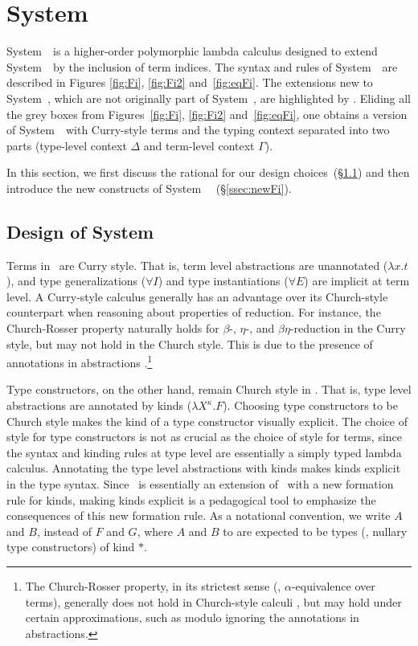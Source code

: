 \section{System \Fi}\label{sec:fi:fi}
System~\Fi\ is a higher-order polymorphic lambda calculus 
designed to extend System~\Fw\ by the inclusion of term indices.
The syntax and rules of System~\Fi\ are described in
Figures \ref{fig:Fi}, \ref{fig:Fi2} and~\ref{fig:eqFi}. 
The extensions new to System~\Fi, which are not originally part of System~\Fw,
are highlighted by .  Eliding all the grey boxes from
Figures~\ref{fig:Fi}, \ref{fig:Fi2} and~\ref{fig:eqFi}, one obtains
a version of System~\Fw\ with Curry-style terms and the typing context
separated into two parts (type-level context $\Delta$ and
term-level context $\Gamma$). 

In this section, we first discuss the rational for our design
choices~(\S\ref{ssec:rationale}) and then introduce the new constructs of
System~\Fi\ %
(\S\ref{ssec:newFi}).


\subsection{Design of System \Fi%
} \label{ssec:rationale}
Terms in \Fi\ are Curry style. That is, term level abstractions are unannotated
($\lambda x.t$), and type generalizations ($\forall I$) and type instantiations
($\forall E$) are implicit at term level. A Curry-style calculus generally has
an advantage over its Church-style counterpart when reasoning about properties of
reduction. For instance, the Church-Rosser property naturally holds for 
$\beta$-, $\eta$-, and $\beta\eta$-reduction in the Curry style, but
may not hold in the Church style. This is due to the presence of annotations in
abstractions \cite{Miquel01}.\footnote{The Church-Rosser property,
in its strictest sense (\ie, $\alpha$-equivalence over terms),
generally does not hold in Church-style calculi , but may hold under
	certain approximations, such as modulo ignoring the annotations
	in abstractions.}

Type constructors, on the other hand, remain Church style in \Fi. That is, type level abstractions are
annotated by kinds ($\lambda X^\kappa.F$). Choosing type constructors
to be Church style makes the kind of
a type constructor visually explicit. The choice of style for type constructors
is not as crucial as the choice of style for terms, since the syntax and
kinding rules at type level are essentially a simply typed lambda calculus.
Annotating the type level abstractions with kinds makes kinds
explicit in the type syntax. Since \Fi\ is essentially an extension of \Fw\
with a new formation rule for kinds, making kinds explicit is a pedagogical
tool to emphasize the consequences of this new formation rule.
As a notational convention, we write
$A$ and $B$, instead of $F$ and $G$, where $A$ and $B$ to are expected
to be types (\ie, nullary type constructors) of kind $*$.

